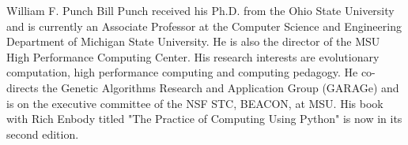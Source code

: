 \documentclass[journal]{IEEEtran}
\begin{document}
\begin{IEEEbiography}{William F. Punch}
Bill Punch received his Ph.D. from the Ohio State University and is currently an
Associate Professor at the Computer Science and Engineering Department of Michigan
State University. He is also the  director of the MSU High Performance Computing
Center. His research interests are evolutionary computation, high performance
computing and computing pedagogy. He co-directs the Genetic Algorithms Research
and Application Group (GARAGe) and is on the executive committee of the NSF STC,
BEACON, at MSU. His book with Rich Enbody titled "The Practice of Computing Using
Python" is now in its second edition.
\end{IEEEbiography}







\end{document}
